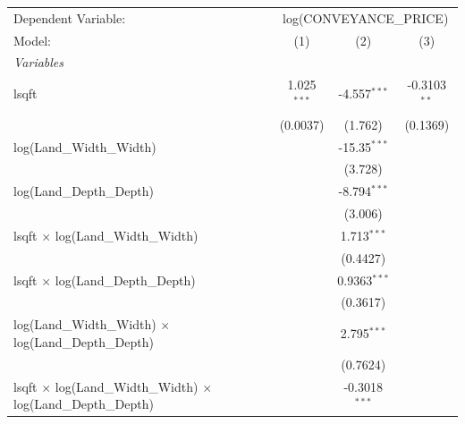 
\begingroup
\centering
\begin{tabular}{lccc}
   \tabularnewline \midrule \midrule
   Dependent Variable: & \multicolumn{3}{c}{log(CONVEYANCE\_PRICE)}\\
   Model:                                                                        & (1)           & (2)             & (3)\\  
   \midrule
   \emph{Variables}\\
   lsqft                                                                         & 1.025$^{***}$ & -4.557$^{***}$  & -0.3103$^{**}$\\   
                                                                                 & (0.0037)      & (1.762)         & (0.1369)\\   
   log(Land\_Width\_Width)                                                       &               & -15.35$^{***}$  &   \\   
                                                                                 &               & (3.728)         &   \\   
   log(Land\_Depth\_Depth)                                                       &               & -8.794$^{***}$  &   \\   
                                                                                 &               & (3.006)         &   \\   
   lsqft $\times$ log(Land\_Width\_Width)                                        &               & 1.713$^{***}$   &   \\   
                                                                                 &               & (0.4427)        &   \\   
   lsqft $\times$ log(Land\_Depth\_Depth)                                        &               & 0.9363$^{***}$  &   \\   
                                                                                 &               & (0.3617)        &   \\   
   log(Land\_Width\_Width) $\times$ log(Land\_Depth\_Depth)                      &               & 2.795$^{***}$   &   \\   
                                                                                 &               & (0.7624)        &   \\   
   lsqft $\times$ log(Land\_Width\_Width) $\times$ log(Land\_Depth\_Depth)       &               & -0.3018$^{***}$ &   \\   

\end{tabular}
